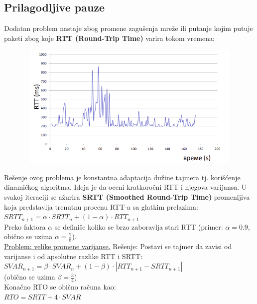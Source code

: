 \documentclass[a4paper]{article}
\begin{document}
    \subsection{Prilagodljive pauze}
        Dodatan problem nastaje zbog promene zagušenja mreže ili putanje kojim putuje paketi
        zbog koje \textbf{RTT (Round-Trip Time)} varira tokom vremena:
        \begin{figure}[H]
            \begin{center}
                \includegraphics[width=120mm,height=60mm]{Slike/tcp_retransmisija2.png}
            \end{center}
        \end{figure}
        Rešenje ovog problema je konstantna adaptacija dužine tajmera tj. korišćenje
        dinamičkog algoritma. Ideja je da oceni kratkoročni RTT i njegova varijansa. U svakoj
        iteraciji se ažurira \textbf{SRTT (Smoothed Round-Trip Time)} promenljiva koja predstavlja
        trenutnu procenu RTT-a sa glatkim prelazima: \\
        \indent \textbf{$SRTT_{n+1} = \alpha \cdot SRTT_{n} + (1-\alpha) \cdot RTT_{n+1}$}\\
        Preko faktora $\alpha$ se definiše koliko se brzo zaboravlja stari RTT (primer:
        $\alpha = 0.9$, obično se uzima $\alpha = \frac{7}{8}$). \\
        \indent \underline{Problem: velike promene varijanse.} Rešenje: Postavi se tajmer da zavisi od varijanse
        i od apsolutne razlike RTT i SRTT: \\ 
        \indent \textbf{$SVAR_{n+1} = \beta \cdot SVAR_{n} + (1 - \beta) \cdot |RTT_{n+1}-SRTT_{n+1}|$}\\
        (obično se uzima $\beta = \frac{3}{4}$)\\
        Konačno RTO se obično računa kao:\\
        \indent \textbf{$RTO = SRTT + 4\cdot SVAR$}\\
\end{document}
